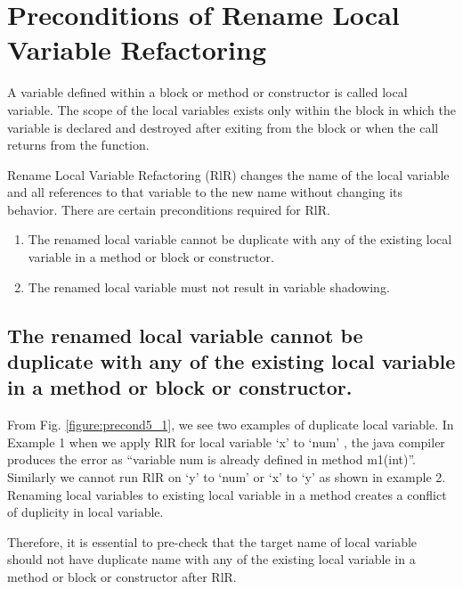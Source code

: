 \section{\textbf{Preconditions of Rename Local Variable Refactoring}}
A variable defined within a block or method or constructor is called local variable. The scope of the local variables exists only within the block in which the variable is declared and destroyed after exiting from the block or when the call returns from the function.

Rename Local Variable Refactoring (RlR) changes the name of the local variable and all references to that variable to the new name without changing its behavior. There are certain preconditions required for RlR.
\begin{enumerate}
\item The renamed local variable cannot be duplicate with any of the existing local variable in a method or block or constructor.
\item The renamed local variable must not result in variable shadowing.
\end{enumerate}

\subsection{The renamed local variable cannot be duplicate with any of the existing local variable in a method or block or constructor.}
 
From Fig. \ref{figure:precond5_1}, we see two examples of duplicate local variable. In Example 1 when we apply RlR for local variable `x' to `num' , the java compiler produces the error as ``variable num is already defined in method m1(int)''. Similarly we cannot run RlR on  `y'  to `num' or `x'  to `y' as shown in example 2. Renaming local variables to existing local variable in a method creates a conflict of duplicity in local variable.

Therefore, it is essential to pre-check that the target name of local variable should not have duplicate name with any of the existing local variable in a method or block or constructor after RlR.

